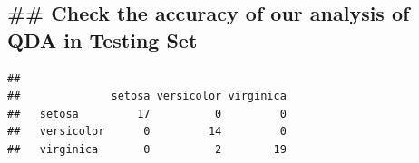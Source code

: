 \documentclass[
]{article}
\newenvironment{Shaded}{\begin{snugshade}}{\end{snugshade}}
\newcommand{\CommentTok}[1]{\textcolor[rgb]{0.56,0.35,0.01}{\textit{#1}}}
\newcommand{\FunctionTok}[1]{\textcolor[rgb]{0.13,0.29,0.53}{\textbf{#1}}}
\newcommand{\NormalTok}[1]{#1}
\newcommand{\OtherTok}[1]{\textcolor[rgb]{0.56,0.35,0.01}{#1}}
\newcommand{\SpecialCharTok}[1]{\textcolor[rgb]{0.81,0.36,0.00}{\textbf{#1}}}
\begin{document}
\hypertarget{check-the-accuracy-of-our-analysis-of-qda-in-testing-set}{%
\subsection{\#\# Check the accuracy of our analysis of QDA in Testing
Set}\label{check-the-accuracy-of-our-analysis-of-qda-in-testing-set}}

\begin{Shaded}
\end{Shaded}

\begin{verbatim}
##             
##              setosa versicolor virginica
##   setosa         17          0         0
##   versicolor      0         14         0
##   virginica       0          2        19
\end{verbatim}
\end{document}
